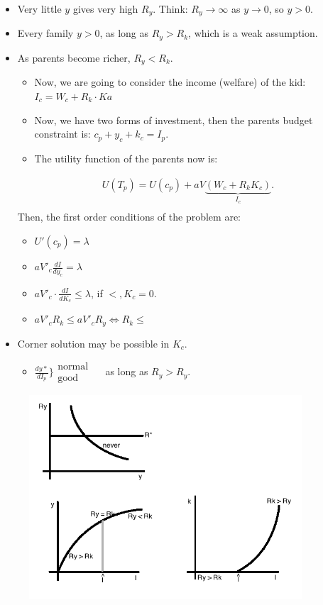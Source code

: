 \documentclass[14pt,notitlepage]{article}
\begin{document}
\begin{itemize}
\item Very little $y$ gives very high $R_y$. Think: $R_y \to \infty$ as $y \to 0$, so $y > 0$.
\item Every family $y > 0$, as long as $R_y > R_k$, which is a weak assumption.
\item As parents become richer, $R_y < R_k$.
    \begin{itemize}
    \item Now, we are going to consider the income (welfare) of the kid: $I_c = W_c + R_k \cdot K a$
    \item Now, we have two forms of investment, then the parents budget constraint is: $c_p + y_c + k_c = I_p$.
    \item The utility function of the parents now is:
    \end{itemize}
\begin{align*}
U(T_p) = U(c_p) + a V \underbrace{(W_c + R_k K_c)}_{I_c}. \\
\end{align*}
Then, the first order conditions of the problem are:
        \begin{itemize}
        \item $U'(c_p) = \lambda$
        \item $a V'_c \frac{dI}{dy_c} = \lambda$
        \item $a V'_c \cdot \frac{dI}{dK_c} \leq \lambda$, if $<, K_c = 0$.
        \item $a V'_c R_k \leq a V'_c R_y \Leftrightarrow R_k \leq$
        \end{itemize}
\item Corner solution may be possible in $K_c$.
    \begin{itemize}
    \item $\frac{dy*}{dI_p}\big\}\substack{\text{normal} \\ \text{good}}$ \ \ as long as $R_y > R_y$.
    \end{itemize}
\end{itemize}

\begin{center}
\begin{figure}[H] 
\caption{}
\centering
\includegraphics[width=4in, height=3in]{plot11.png}
\end{figure}
\end{center}
\end{document}
